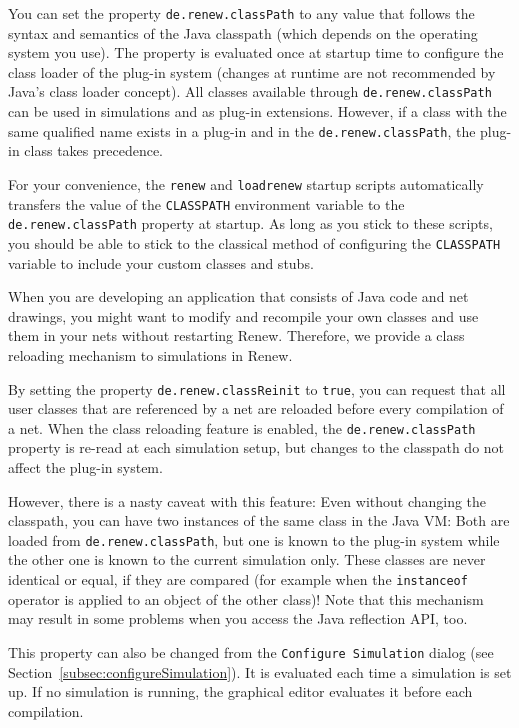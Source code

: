 You can set the property \texttt{de.renew.classPath} to any value that
follows the syntax and semantics of the Java classpath (which depends
on the operating system you use).
The property is evaluated once at startup time to configure the class
loader of the plug-in system (changes at runtime are not recommended by
Java's class loader concept).
All classes available through \texttt{de.renew.classPath} can be used
in simulations and as plug-in extensions.
However, if a class with the same qualified name exists in a plug-in
and in the \texttt{de.renew.classPath}, the plug-in class takes
precedence.

For your convenience, the \texttt{renew} and \texttt{loadrenew} startup scripts automatically
transfers the value of the \texttt{CLASSPATH} environment variable to
the \texttt{de.renew.classPath} property at startup.
As long as you stick to these scripts, you should be able
to stick to the classical method of configuring the \texttt{CLASSPATH}
variable to include your custom classes and stubs.

When you are developing an application that consists
of Java code and net drawings, you might want to modify and
recompile your own classes and use them in your nets without
restarting Renew. 
Therefore, we provide a class reloading mechanism to simulations
in Renew.

By setting the property \texttt{de.renew.classReinit} to
\texttt{true},
you can request that all user classes that are referenced by
a net are reloaded before every compilation of a net.
When the class reloading feature is enabled, the
\texttt{de.renew.classPath} property is re-read at each
simulation setup, but changes to the classpath do not affect the
plug-in system.

However, there is a nasty caveat with this feature:
Even without changing the classpath, you can have two instances of the
same class in the Java VM: 
Both are loaded from \texttt{de.renew.classPath}, but one is known
to the plug-in system while the other one is known to the current
simulation only. 
These classes are never identical or equal, if they are compared (for
example when the \texttt{instanceof} operator is applied to an object
of the other class)!
Note that this mechanism may result in some 
problems when you access the Java reflection API, too.

This property can also be changed from the \texttt{Configure
Simulation} dialog (see Section~\ref{subsec:configureSimulation}).
It is evaluated each time a simulation is set up.
If no simulation is running, the graphical editor evaluates it before
each compilation.

